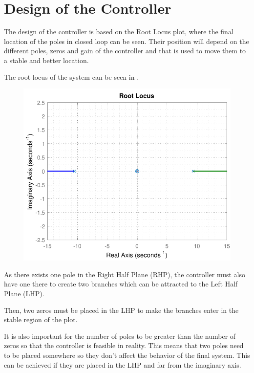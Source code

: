 \section{Design of the Controller}\label{designController}
The design of the controller is based on the Root Locus plot, where the final location of the poles in closed loop can be seen. Their position will depend on the different poles, zeros and gain of the controller and that is used to move them to a stable and better location.

The root locus of the system can be seen in .

\begin{figure}[H]
	\centering 
	\includegraphics[scale=.56]{figures/rlocusCubli}
 	\label{rlocusCubli2}
\end{figure}
%
As there exists one pole in the Right Half Plane (RHP), the controller must also have one there to create two branches which can be attracted to the Left Half Plane (LHP).

Then, two zeros must be placed in the LHP to make the branches enter in the stable region of the plot.

It is also important for the number of poles to be greater than the number of zeros so that the controller is feasible in reality. This means that two poles need to be placed somewhere so they don't affect the behavior of the final system. This can be achieved if they are placed in the LHP and far from the imaginary axis.

